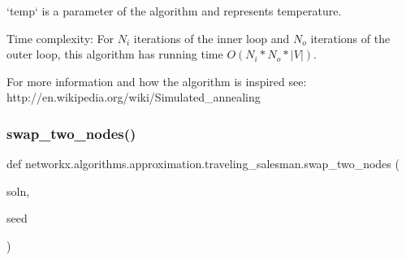 \begin{DoxyVerb}
`temp` is a parameter of the algorithm and represents temperature.

Time complexity:
For $N_i$ iterations of the inner loop and $N_o$ iterations of the
outer loop, this algorithm has running time $O(N_i * N_o * |V|)$.

For more information and how the algorithm is inspired see:
http://en.wikipedia.org/wiki/Simulated_annealing
\end{DoxyVerb}
 \mbox{\label{namespacenetworkx_1_1algorithms_1_1approximation_1_1traveling__salesman_a0fdde926c7d59c76a087e4b4ee5502e1}} 
\subsubsection{\texorpdfstring{swap\+\_\+two\+\_\+nodes()}{swap\_two\_nodes()}}
{\footnotesize\ttfamily def networkx.\+algorithms.\+approximation.\+traveling\+\_\+salesman.\+swap\+\_\+two\+\_\+nodes (\begin{DoxyParamCaption}\item[{}]{soln,  }\item[{}]{seed }\end{DoxyParamCaption})}

